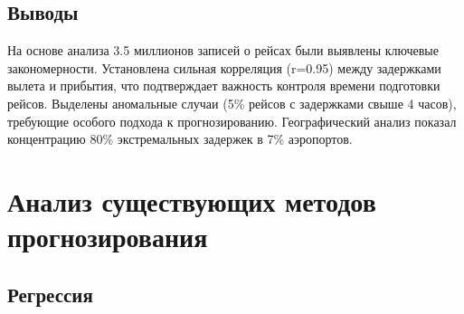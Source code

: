 %
%
%
%
%
%
%

\subsection*{Выводы}

На основе анализа 3.5 миллионов записей о рейсах были выявлены ключевые закономерности.
Установлена сильная корреляция (r=0.95) между задержками вылета и прибытия, что подтверждает важность контроля времени подготовки рейсов.
Выделены аномальные случаи (5\% рейсов с задержками свыше 4 часов), требующие особого подхода к прогнозированию.
Географический анализ показал концентрацию 80\% экстремальных задержек в 7\% аэропортов.


\section{Анализ существующих методов прогнозирования}

\subsection{Регрессия}

